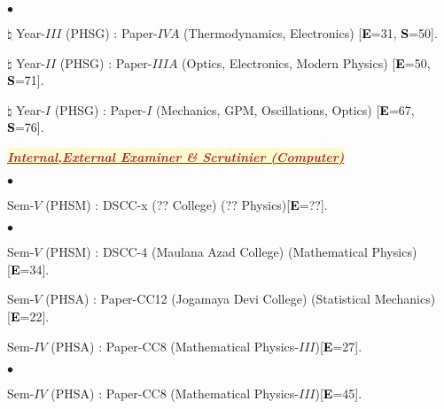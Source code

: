 \documentclass[margin,line]{res}
\newenvironment{list1}{
  \begin{list}{\ding{113}}{%
      \setlength{\itemsep}{0in}
      \setlength{\parsep}{0in} \setlength{\parskip}{0in}
      \setlength{\topsep}{0in} \setlength{\partopsep}{0in} 
      \setlength{\leftmargin}{0.17in}}}{\end{list}}
\newenvironment{list2}{
  \begin{list}{$\bullet$}{%
      \setlength{\itemsep}{0in}
      \setlength{\parsep}{0in} \setlength{\parskip}{0in}
      \setlength{\topsep}{0in} \setlength{\partopsep}{0in} 
      \setlength{\leftmargin}{0.2in}}}{\end{list}}
\begin{document}
\begin{resume}
\begin{list2}
\item[$\pmb{\natural}$] Year-$III$ (PHSG) : Paper-$IVA$ (Thermodynamics, Electronics) [\textcolor{black}{\bf E}=31, \textcolor{black}{\bf S}=50].
\item[$\pmb{\natural}$] Year-$II$ (PHSG) : Paper-$IIIA$ (Optics, Electronics, Modern Physics) [\textcolor{black}{\bf E}=50, \textcolor{black}{\bf S}=71].
\item[$\pmb{\natural}$] Year-$I$ (PHSG) : Paper-$I$ (Mechanics, GPM, Oscillations, Optics) [\textcolor{black}{\bf E}=67, \textcolor{black}{\bf S}=76].
\end{list2}
\vspace{2mm}
\begin{list1}
\item[] \colorbox{lemonchiffon}{\textcolor{brown}{\underline{\textbf{\textit{Internal,External Examiner \& Scrutinier (Computer)}}}}}
\vspace{1mm}
\end{list1}
\begin{list1}
	\item[] \textcolor{iris}{}
	\vspace{1mm}
\end{list1}
\begin{list2}
\item Sem-$V$ (PHSM) : DSCC-x (?? College) (?? Physics)[\textcolor{black}{\bf E}=??]. 
\end{list2}
\begin{list1}
\item[] \textcolor{iris}{}
\vspace{1mm}
\end{list1}
\begin{list2}
\item Sem-$V$ (PHSM) : DSCC-4 (Maulana Azad College) (Mathematical Physics)[\textcolor{black}{\bf E}=34]. 
\item Sem-$V$ (PHSA) : Paper-CC12 (Jogamaya Devi College) (Statistical Mechanics)[\textcolor{black}{\bf E}=22]. 
\item Sem-$IV$ (PHSA) : Paper-CC8 (Mathematical Physics-$III$)[\textcolor{black}{\bf E}=27]. 
\end{list2}
\begin{list1}
\item[] \textcolor{iris}{}
\vspace{1mm}
\end{list1}
\begin{list2}
\item Sem-$IV$ (PHSA) : Paper-CC8 (Mathematical Physics-$III$)[\textcolor{black}{\bf E}=45]. 

\end{list2}
\end{resume}
\end{document}
